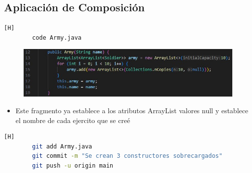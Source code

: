 \documentclass{article}
\begin{document}
	
	\subsection{Aplicación de Composición}
	
	\begin{lstlisting}[language=bash,caption={Se crea la Army}][H]
		code Army.java
	\end{lstlisting}
	\begin{figure}[H]
		\centering
		\includegraphics[width=1\textwidth,keepaspectratio]{img/constructorArmy.jpg}
	\end{figure}
	\begin{itemize}	
		\item Este fragmento ya establece a los atributos ArrayList valores null y establece el nombre de cada ejercito que se creé  
	\end{itemize}	
	\begin{lstlisting}[language=bash,caption={Commit: 2f415f95bd8470ae0b16e5a2c7af7d2fdfb1a841 }][H]
		git add Army.java
		git commit -m "Se crean 3 constructores sobrecargados"			
		git push -u origin main
	\end{lstlisting}
	
	
	
	
\end{document}
